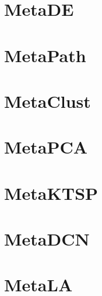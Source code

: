 \documentclass{article}
\begin{document}
\section{MetaDE}

\section{MetaPath}

\section{MetaClust}

\section{MetaPCA}

\section{MetaKTSP}

\section{MetaDCN}

\section{MetaLA}



 
\end{document}
